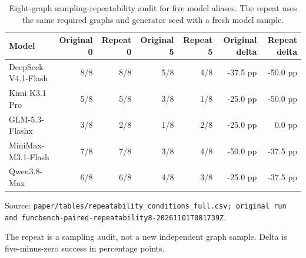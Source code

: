 \begin{table}[htbp]
\centering
\caption{Eight-graph sampling-repeatability audit for five model aliases. The repeat uses the same required graphs and generator seed with a fresh model sample.}
\label{tab:repeatability}
\footnotesize
\setlength{\tabcolsep}{3pt}
\renewcommand{\arraystretch}{1.08}
\begin{tabularx}{\textwidth}{>{\raggedright\arraybackslash}Xrrrrrr}
\toprule
Model & Original 0 & Repeat 0 & Original 5 & Repeat 5 & Original delta & Repeat delta \\
\midrule
DeepSeek-V4.1-Flash & 8/8 & 8/8 & 5/8 & 4/8 & -37.5 pp & -50.0 pp \\
Kimi K3.1 Pro & 5/8 & 5/8 & 3/8 & 1/8 & -25.0 pp & -50.0 pp \\
GLM-5.3-Flashx & 3/8 & 2/8 & 1/8 & 2/8 & -25.0 pp & 0.0 pp \\
MiniMax-M3.1-Flash & 7/8 & 7/8 & 3/8 & 4/8 & -50.0 pp & -37.5 pp \\
Qwen3.8-Max & 6/8 & 6/8 & 4/8 & 3/8 & -25.0 pp & -37.5 pp \\
\bottomrule
\end{tabularx}
\par\parbox{\linewidth}{\raggedright\footnotesize Source: \texttt{paper/\allowbreak{}tables/\allowbreak{}repeatability\_conditions\_full.csv; original run and funcbench-paired-repeatability8-20261101T081739Z}.}
\par\parbox{\linewidth}{\raggedright\footnotesize The repeat is a sampling audit, not a new independent graph sample. Delta is five-minus-zero success in percentage points.}
\end{table}
